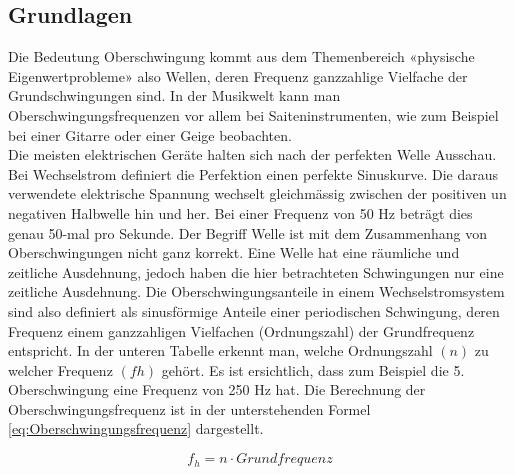 \subsection{Grundlagen}
Die Bedeutung Oberschwingung kommt aus dem Themenbereich «physische Eigenwertprobleme» also Wellen, deren Frequenz ganzzahlige Vielfache der Grundschwingungen sind. In der Musikwelt kann man Oberschwingungsfrequenzen vor allem bei Saiteninstrumenten, wie zum Beispiel bei einer Gitarre oder einer Geige beobachten.\\
Die meisten elektrischen Geräte halten sich nach der perfekten Welle Ausschau. Bei Wechselstrom definiert die Perfektion einen perfekte Sinuskurve. Die daraus verwendete elektrische Spannung wechselt gleichmässig zwischen der positiven un negativen Halbwelle hin und her. Bei einer Frequenz von 50 Hz beträgt dies genau 50-mal pro Sekunde. Der Begriff Welle ist mit dem Zusammenhang von Oberschwingungen nicht ganz korrekt. Eine Welle hat eine räumliche und zeitliche Ausdehnung, jedoch haben die hier betrachteten Schwingungen nur eine zeitliche Ausdehnung. Die Oberschwingungsanteile in einem Wechselstromsystem sind also definiert als sinusförmige Anteile einer periodischen Schwingung, deren Frequenz einem ganzzahligen Vielfachen (Ordnungszahl) der Grundfrequenz entspricht. In der unteren Tabelle erkennt man, welche Ordnungszahl $(n)$  zu welcher Frequenz $(fh)$ gehört. Es ist ersichtlich, dass zum Beispiel die 5. Oberschwingung eine Frequenz von 250 Hz hat. Die Berechnung der Oberschwingungsfrequenz ist in der unterstehenden Formel \ref{eq:Oberschwingungsfrequenz} dargestellt.

\begin{equation}\label{eq:Oberschwingungsfrequenz}
f_h = n \cdot Grundfrequenz
\end{equation}

